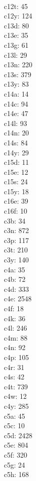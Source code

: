 \begin{multicols}{8}
  \\ c12t: 45
  \\ c12y: 124
  \\ c13d: 80
  \\ c13e: 35
  \\ c13g: 61
  \\ c13l: 29
  \\ c13n: 220
  \\ c13s: 379
  \\ c13y: 83
  \\ c14a: 14
  \\ c14c: 94
  \\ c14e: 47
  \\ c14l: 93
  \\ c14n: 20
  \\ c14s: 84
  \\ c14y: 29
  \\ c15d: 11
  \\ c15e: 12
  \\ c15s: 24
  \\ c15y: 18
  \\ c16e: 39
  \\ c16f: 10
  \\ c3b: 34
  \\ c3n: 872
  \\ c3p: 117
  \\ c3t: 210
  \\ c3y: 140
  \\ c4a: 35
  \\ c4b: 72
  \\ c4d: 333
  \\ c4e: 2548
  \\ c4f: 18
  \\ c4k: 36
  \\ c4l: 246
  \\ c4m: 88
  \\ c4n: 92
  \\ c4p: 105
  \\ c4r: 31
  \\ c4s: 42
  \\ c4t: 739
  \\ c4w: 12
  \\ c4y: 285
  \\ c5a: 45
  \\ c5c: 10
  \\ c5d: 2428
  \\ c5e: 804
  \\ c5f: 320
  \\ c5g: 24
  \\ c5h: 168

\end{multicols}
